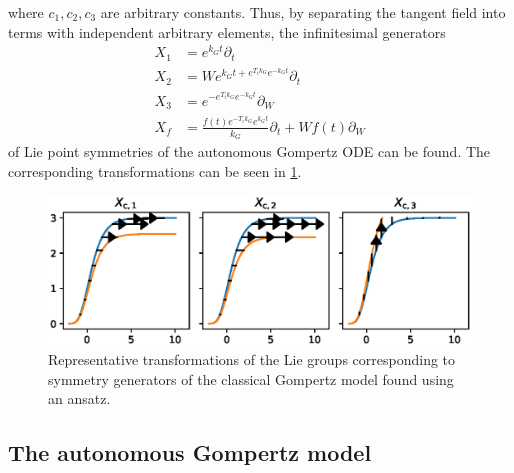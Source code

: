 where \(c_1, c_2, c_3\) are arbitrary constants.
Thus, by separating the tangent field into terms with independent arbitrary elements, the infinitesimal generators
\begin{align*}
  X_1 &= e^{k_{G} t} \partial_t \\
  X_2 &= W e^{k_{G} t + e^{T_{i} k_{G}} e^{- k_{G} t}} \partial_t \\
  X_3 &= e^{- e^{T_{i} k_{G}} e^{- k_{G} t}} \partial_W \\
  X_f &= \frac{f{\left(t \right)} e^{- T_{i} k_{G}} e^{k_{G} t}}{k_{G}} \partial_t + W f{\left(t \right)} \partial_W
\end{align*}
of Lie point symmetries of the autonomous Gompertz ODE  can be found.
The corresponding transformations can be seen in \cref{fig:gompertz-classical-ansatz}.
\begin{figure}
  \centering
  \includegraphics[width=.96\textwidth]{images/gompertz-classical-ansatz}
  \caption{Representative transformations of the Lie groups corresponding to symmetry generators of the classical Gompertz model found using an ansatz.}
  \label{fig:gompertz-classical-ansatz}
\end{figure}

\subsection{The autonomous Gompertz model}

